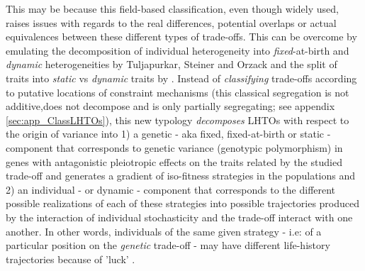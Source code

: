 \documentclass[10pt,a4paper]{article}
\begin{document}
This may be because this field-based classification, even though widely used, raises %
issues with regards to the real differences, potential overlaps or actual equivalences between these different types of trade-offs.
This can be overcome by emulating the decomposition of individual heterogeneity into \emph{fixed}-at-birth and \emph{dynamic} heterogeneities by Tuljapurkar, Steiner and Orzack \citep{Steiner2010,Tuljapurkar2009b,Tuljapurkar2010} and the split of traits into \emph{static} vs \emph{dynamic} traits by \citet{Vindenes2015}.%
Instead of \emph{classifying} trade-offs according to putative locations of constraint mechanisms (this classical segregation is not additive,does not decompose and is only  partially segregating; see appendix \ref{sec:app_ClassLHTOs}), this new typology \emph{decomposes} LHTOs with respect to the origin of variance into
1) a genetic - aka fixed, fixed-at-birth or static - component that corresponds to genetic variance (genotypic polymorphism) in genes with antagonistic pleiotropic effects on the traits  related by the studied trade-off and  generates a gradient of iso-fitness strategies in the populations and 2) an individual - or dynamic - component  that corresponds to the different possible realizations  of each of these strategies into possible trajectories  produced by the interaction of  individual stochasticity and  the trade-off interact with one another. 
In other words, individuals of the same given strategy - i.e: of a particular position on the \emph{genetic} trade-off - may have different life-history trajectories because of 'luck' \citep{Snyder2018,Caswell2009,Tuljapurkar2009b}. 
\end{document}
